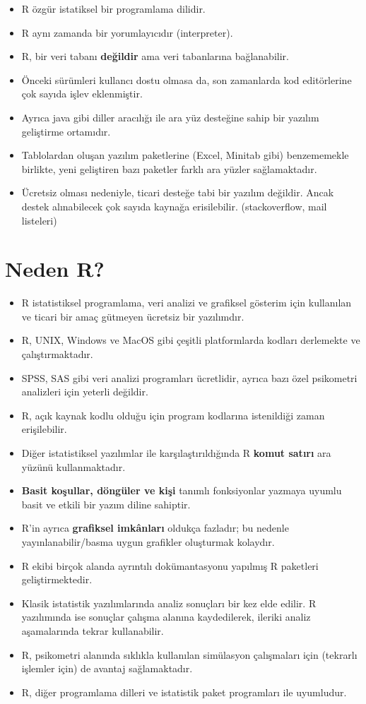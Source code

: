 \documentclass[
  oneside]{book}
\begin{document}
\begin{itemize}
\item
  R özgür istatiksel bir programlama dilidir.
\item
  R aynı zamanda bir yorumlayıcıdır (interpreter).
\item
  R, bir veri tabanı \textbf{değildir} ama veri tabanlarına bağlanabilir.
\item
  Önceki sürümleri kullancı dostu olmasa da, son zamanlarda kod editörlerine çok sayıda işlev eklenmiştir.
\item
  Ayrıca java gibi diller aracılığı ile ara yüz desteğine sahip bir yazılım geliştirme ortamıdır.
\item
  Tablolardan oluşan yazılım paketlerine (Excel, Minitab gibi) benzememekle birlikte, yeni geliştiren bazı paketler farklı ara yüzler sağlamaktadır.
\item
  Ücretsiz olması nedeniyle, ticari desteğe tabi bir yazılım değildir. Ancak destek alınabilecek çok sayıda kaynağa erisilebilir. (stackoverflow, mail listeleri)
\end{itemize}

\hypertarget{neden-r}{%
\section{Neden R?}\label{neden-r}}

\begin{itemize}
\item
  R istatistiksel programlama, veri analizi ve grafiksel gösterim için kullanılan ve ticari bir amaç gütmeyen ücretsiz bir yazılımdır.
\item
  R, UNIX, Windows ve MacOS gibi çeşitli platformlarda kodları derlemekte ve çalıştırmaktadır.
\item
  SPSS, SAS gibi veri analizi programları ücretlidir, ayrıca bazı özel psikometri analizleri için yeterli değildir.
\item
  R, açık kaynak kodlu olduğu için program kodlarına istenildiği zaman erişilebilir.
\item
  Diğer istatistiksel yazılımlar ile karşılaştırıldığında R \textbf{komut satırı} ara yüzünü kullanmaktadır.
\item
  \textbf{Basit koşullar, döngüler ve kişi} tanımlı fonksiyonlar yazmaya uyumlu basit ve etkili bir yazım diline sahiptir.
\item
  R'in ayrıca \textbf{grafiksel imkânları} oldukça fazladır; bu nedenle yayınlanabilir/basma uygun grafikler oluşturmak kolaydır.
\item
  R ekibi birçok alanda ayrıntılı dokümantasyonu yapılmış R paketleri geliştirmektedir.
\item
  Klasik istatistik yazılımlarında analiz sonuçları bir kez elde edilir. R yazılımında ise sonuçlar çalışma alanına kaydedilerek, ileriki analiz aşamalarında tekrar kullanabilir.
\item
  R, psikometri alanında sıklıkla kullanılan simülasyon çalışmaları için (tekrarlı işlemler için) de avantaj sağlamaktadır.
\item
  R, diğer programlama dilleri ve istatistik paket programları ile uyumludur.
\end{itemize}
\end{document}
